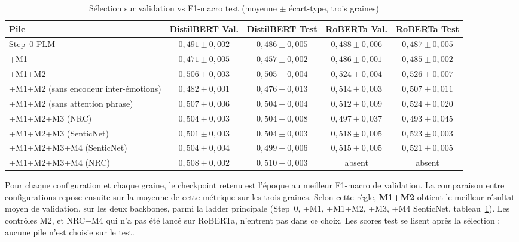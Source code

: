 \begin{table}[H]
\centering
\caption{Sélection sur validation vs F1-macro test (moyenne $\pm$ écart-type, trois graines)}
\label{tab:expe-val-test-selection}
\small
\renewcommand{\arraystretch}{1.15}
\begin{tabular}{|p{4.5cm}|c|c|c|c|}
\hline
\textbf{Pile} & \textbf{DistilBERT Val.} & \textbf{DistilBERT Test} & \textbf{RoBERTa Val.} & \textbf{RoBERTa Test} \\
\hline
Step~0 PLM & $0{,}491 \pm 0{,}002$ & $0{,}486 \pm 0{,}005$ & $0{,}488 \pm 0{,}006$ & $0{,}487 \pm 0{,}005$ \\
\hline
+M1 & $0{,}471 \pm 0{,}005$ & $0{,}457 \pm 0{,}002$ & $0{,}486 \pm 0{,}001$ & $0{,}485 \pm 0{,}002$ \\
\hline
+M1+M2 & $0{,}506 \pm 0{,}003$ & $0{,}505 \pm 0{,}004$ & $0{,}524 \pm 0{,}004$ & $0{,}526 \pm 0{,}007$ \\
\hline
+M1+M2 (sans encodeur inter-émotions) & $0{,}482 \pm 0{,}001$ & $0{,}476 \pm 0{,}013$ & $0{,}514 \pm 0{,}003$ & $0{,}507 \pm 0{,}011$ \\
\hline
+M1+M2 (sans attention phrase) & $0{,}507 \pm 0{,}006$ & $0{,}504 \pm 0{,}004$ & $0{,}512 \pm 0{,}009$ & $0{,}524 \pm 0{,}020$ \\
\hline
+M1+M2+M3 (NRC) & $0{,}504 \pm 0{,}003$ & $0{,}504 \pm 0{,}008$ & $0{,}497 \pm 0{,}037$ & $0{,}493 \pm 0{,}045$ \\
\hline
+M1+M2+M3 (SenticNet) & $0{,}501 \pm 0{,}003$ & $0{,}504 \pm 0{,}003$ & $0{,}518 \pm 0{,}005$ & $0{,}523 \pm 0{,}003$ \\
\hline
+M1+M2+M3+M4 (SenticNet) & $0{,}504 \pm 0{,}004$ & $0{,}499 \pm 0{,}006$ & $0{,}515 \pm 0{,}005$ & $0{,}521 \pm 0{,}005$ \\
\hline
+M1+M2+M3+M4 (NRC) & $0{,}508 \pm 0{,}002$ & $0{,}510 \pm 0{,}003$ & absent & absent \\
\hline
\end{tabular}
\end{table}

Pour chaque configuration et chaque graine, le checkpoint retenu est
l'époque au meilleur F1-macro de validation. La comparaison entre
configurations repose ensuite sur la moyenne de cette métrique sur les
trois graines. Selon cette règle, \textbf{M1+M2} obtient le meilleur
résultat moyen de validation, sur les deux backbones, parmi la ladder
principale (Step~0, +M1, +M1+M2, +M3, +M4 SenticNet,
tableau~\ref{tab:expe-val-test-selection}). Les contrôles M2, et NRC+M4
qui n'a pas été lancé sur RoBERTa, n'entrent pas dans ce choix. Les
scores test se lisent après la sélection : aucune pile n'est choisie
sur le test.

